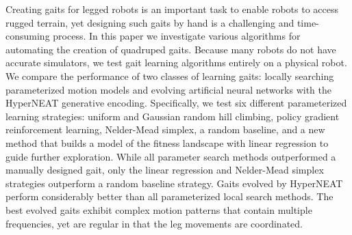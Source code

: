 Creating gaits for legged robots is an important task to enable robots
to access rugged terrain, yet designing such gaits by hand is a
challenging and time-consuming process. In this paper we investigate
various algorithms for automating the creation of quadruped
gaits. Because many robots do not have accurate simulators, we test
gait learning algorithms entirely on a physical robot.  We compare the
performance of two classes of learning gaits: locally searching
parameterized motion models and evolving artificial neural networks
with the HyperNEAT generative encoding. Specifically, we test six
different parameterized learning strategies: uniform and Gaussian
random hill climbing, policy gradient reinforcement learning,
Nelder-Mead simplex, a random baseline, and a new method that builds a
model of the fitness landscape with linear regression to guide further
exploration.  While all parameter search methods outperformed a
manually designed gait, only the linear regression and Nelder-Mead
simplex strategies outperform a random baseline strategy. Gaits
evolved by HyperNEAT perform considerably better than all
parameterized local search methods.  The best evolved gaits exhibit
complex motion patterns that contain multiple frequencies, yet are
regular in that the leg movements are coordinated.


